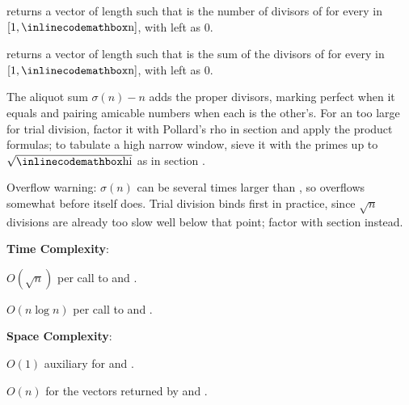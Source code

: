 \begin{compactitem}
  \item {} returns a vector  of length  such that  is the number of divisors of  for every  in $[1, {\inlinecodemath{n}}]$, with  left as $0$.
  \item {} returns a vector  of length  such that  is the sum of the divisors of  for every  in $[1, {\inlinecodemath{n}}]$, with  left as $0$.
\end{compactitem}

The aliquot sum $\sigma(n) - n$ adds the proper divisors, marking  perfect when it equals  and pairing amicable numbers when each is the other's. For an  too large for trial division, factor it with Pollard's rho in section  and apply the product formulas; to tabulate a high narrow window, sieve it with the primes up to $\sqrt{{\inlinecodemath{hi}}}$ as in section .

Overflow warning: $\sigma(n)$ can be several times larger than , so  overflows  somewhat before  itself does. Trial division binds first in practice, since $\sqrt{n}$ divisions are already too slow well below that point; factor with section  instead.

\textbf{Time Complexity}:
\begin{compactitem}
  \item $O(\sqrt{n})$ per call to  and .
  \item $O(n \log n)$ per call to  and .
\end{compactitem}

\textbf{Space Complexity}:
\begin{compactitem}
  \item $O(1)$ auxiliary for  and .
  \item $O(n)$ for the vectors returned by  and .
\end{compactitem}

